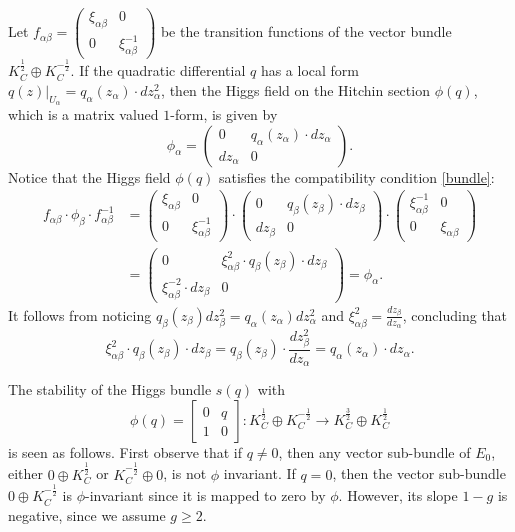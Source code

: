 \documentclass[oneside, 11pt]{amsart}
\theoremstyle{definition}
\numberwithin{equation}{subsection}
\def\a{\alpha}
\def\b{\beta}
\begin{document}
Let $f_{\a\b}=\begin{pmatrix}
\xi_{\a\b}&0
\\ 0& \xi_{\a\b}^{-1}
\end{pmatrix}$ be the transition functions of the vector bundle $K_{C}^{\frac{1}{2}}\oplus K_{C}^{-\frac{1}{2}}$.
If  the quadratic differential $q$ has 
a local form $q(z)|_{U_{\a}}=q_\a(z_{\a})\cdot dz_{\a}^2$, then the Higgs field on the Hitchin section $\phi(q)$, which is a matrix valued $1$-form, is given by 
$$
\phi_{\a}=\begin{pmatrix}
0&q_\a(z_{\a})\cdot dz_{\a}\\ dz_{\a}& 0
\end{pmatrix}.
$$
Notice that the Higgs field $\phi(q)$ satisfies the compatibility condition \eqref{bundle}:
\begin{align}
f_{\a\b}\cdot\phi_{\b}\cdot f_{\a\b}^{-1}&=
\nonumber
\begin{pmatrix}
\xi_{\a\b}&0\\ 0& \xi^{-1}_{\a\b}
\end{pmatrix}\cdot
\begin{pmatrix}
0&q_\b(z_{\b})\cdot dz_{\b}\\ dz_{\b} & 0
\end{pmatrix}\cdot
\begin{pmatrix}
\xi_{\a\b}^{-1}&0\\ 0& \xi_{\a\b}
\end{pmatrix}\\
\nonumber
&=\begin{pmatrix}
0& \xi_{\a\b}^2\cdot q_\b(z_{\b})\cdot dz_{\b}\\ \xi_{\a\b}^{-2} \cdot dz_{\b}& 0
\end{pmatrix}
=\phi_{\a}.
\end{align}
It follows from noticing
$q_\b(z_{\b})dz_{\b}^2=q_\a(z_{\a})dz_{\a}^2$ and
$\xi_{\a\b}^{2}=\frac{dz_{\b}}{dz_{\a}}$, concluding that
$$\xi_{\a\b}^{2}\cdot q_\b(z_{\b})\cdot dz_{\b}=q_\b(z_{\b})\cdot \frac{dz_{\b}^2}{dz_{\a}}=
q_\a(z_{\a})\cdot dz_{\a}.$$


The stability of  the Higgs bundle $s(q)$ 
with 
$$\phi(q)=\begin{bmatrix}
0&q\\
1&0
\end{bmatrix}:K_C^{\frac{1}{2}}\oplus K_C^{-\frac{1}{2}}\stackrel{}{\rightarrow}
K_C^{\frac{3}{2}}\oplus K_C^{\frac{1}{2}}
$$
is seen as follows.
First observe that if $q\neq 0$, then
any vector sub-bundle of $E_0$, either
$0\oplus K_C^{\frac{1}{2}}$ or $K_C^{-\frac{1}{2}}\oplus 0$, is not $\phi$ invariant. If $q=0$, then the vector sub-bundle  $0\oplus K_C^{-\frac{1}{2}}$ is $\phi$-invariant since it is mapped to zero by $\phi$. However, its slope $1-g$ is negative, since we assume
$g\ge 2$.
\end{document}
